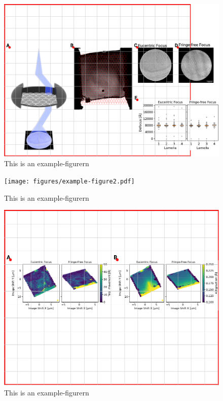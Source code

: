 \documentclass[
]{article}
\begin{document}
\begin{figure}
\hypertarget{fig:approach}{%
\centering
\includegraphics{figures/example-figure.pdf}
\caption{This is an example-figurern}\label{fig:approach}
}
\end{figure}

\begin{figure}
\hypertarget{fig:approach2}{%
\centering
\texttt{[image: figures/example-figure2.pdf]}
\caption{This is an example-figurern}\label{fig:approach2}
}
\end{figure}

\begin{figure}
\hypertarget{fig:approach3}{%
\centering
\includegraphics{figures/example-figure3.pdf}
\caption{This is an example-figurern}\label{fig:approach3}
}
\end{figure}
\end{document}
